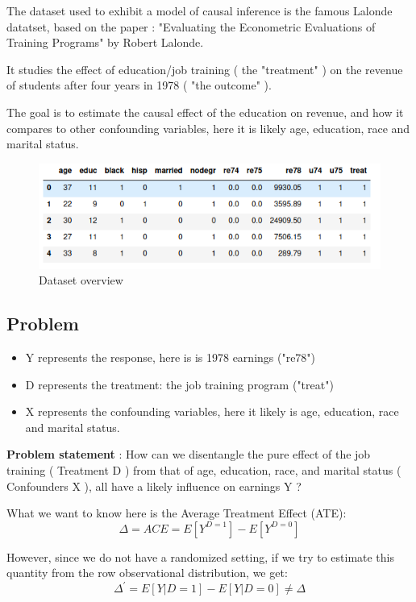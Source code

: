 \documentclass{article}
\begin{document}
The dataset used to exhibit a model of causal inference is the famous Lalonde datatset, based on the paper : "Evaluating the Econometric Evaluations of Training Programs" by Robert Lalonde\cite{berkeleyExample}.

It studies the effect of education/job training ( the "treatment" ) on the revenue of students after four years in 1978 ( "the outcome" ).

The goal is to estimate the causal effect of the education on revenue, and how it compares to other confounding variables, here it is likely age, education, race and marital status.

\begin{figure}[h]
\centering
\includegraphics[width=0.8 \textwidth]{../figures/data_overview.png}
\caption{Dataset overview}
\end{figure}


\subsection{ Problem}

\begin{itemize}
    \item Y represents the response, here is is 1978 earnings ("re78")
    \item D represents the treatment: the job training program ("treat")
    \item X represents the confounding variables, here it likely is age, education, race and marital status.
\end{itemize}



\textbf{Problem statement} : How can we disentangle the pure effect of the job training ( Treatment D ) from that of age, education, race, and marital status ( Confounders X ), all have a likely influence on earnings Y ?
 


What we want to know here is the Average Treatment Effect (ATE):
$$ \Delta = ACE = E[Y^{D=1}] - E[Y^{D=0}] $$

However, since we do not have a randomized setting, if we try to estimate this quantity from the row observational distribution, we get:
$$ \Delta^{'} =E[Y \vert  D=1] - E[Y \vert  D=0] \neq \Delta $$
\end{document}
